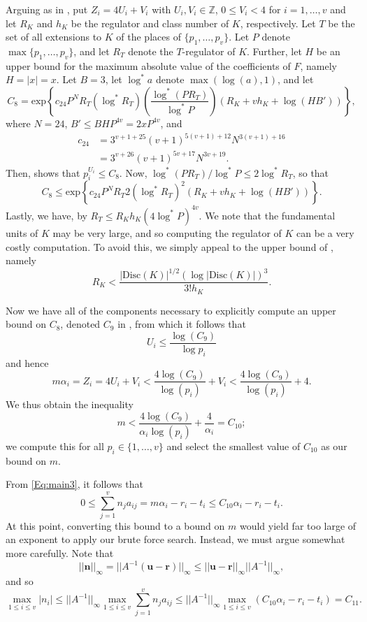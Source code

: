 Arguing as in \cite{BugeaudGyory}, put $Z_i = 4U_i + V_i$ with $U_i, V_i \in \mathbb{Z}$, $0 \leq V_i < 4$ for $i = 1, \dots, v$ and let $R_K$ and $h_K$ be the regulator and class number of $K$, respectively. Let $T$ be the set of all extensions to $K$ of the places of $\{p_1, \dots, p_v\}$. Let $P$ denote $\max\{p_1, \dots, p_v\}$, and let $R_T$ denote the $T$-regulator of $K$. Further, let $H$ be an upper bound for the maximum absolute value of the coefficients of $F$, namely $H = |x| = x$. Let $B = 3$, let $\log^*{a}$ denote $\max(\log(a), 1)$, and let
\[C_8 = \text{exp}\left\{c_{24}P^N R_T (\log^*R_T)\left(\frac{\log^*(PR_T)}{\log^*P}\right)(R_{K} + vh_{K} + \log(HB'))\right\},\]
where $N = 24$, $B' \leq BHP^{4v} = 2xP^{4v}$, and 
\[\begin{array}{cc}
c_{24}  & = 3^{v+1 +25}(v+1)^{5(v+1) +12} N^{3(v+1)+16} \\
	& = 3^{v + 26}(v+1)^{5v+17}N^{3v + 19}.
\end{array}\]
Then, \cite{BugeaudGyory} shows that $p_i^{U_i} \leq C_8$. Now, ${\log^*(PR_T)/\log^*P \leq 2\log^*R_T}$, so that 
\[C_8 \leq \text{exp}\left\{c_{24}P^N R_T 2(\log^*R_T)^2(R_{K} + vh_{K} + \log(HB'))\right\}.\] 
Lastly, we have, by \cite{BugeaudGyory} $R_T \leq R_Kh_K(4\log^*P)^{4v}$. We note that the fundamental units of $K$ may be very large, and so computing the regulator of $K$ can be a very costly computation. To avoid this, we simply appeal to the upper bound of \cite{BugeaudGyory}, namely
\[R_K < \frac{|\text{Disc}(K)|^{1/2}(\log|\text{Disc}(K)|)^{3}}{3!h_K}.\]

Now we have all of the components necessary to explicitly compute an upper bound on $C_8$, denoted $C_9$ in \cite{BugeaudGyory}, from which it follows that
\[U_i \leq \frac{\log(C_9)}{\log{p_i}}\]
and hence
\[m\alpha_i = Z_i = 4U_i + V_i < \frac{4\log(C_9)}{\log(p_i)} + V_i < \frac{4\log(C_9)}{\log(p_i)} + 4.\] 
We thus obtain the inequality  
\[m < \frac{4\log(C_9)}{\alpha_i\log(p_i)} + \frac{4}{\alpha_i} = C_{10};\]
we compute this for all $p_i \in \{1, \dots, v\}$ and select the smallest value of $C_{10}$ as our bound on $m$. 
 
From \eqref{Eq:main3}, it follows that
\[0 \leq \sum_{j=1}^v n_ja_{ij} = m\alpha_i - r_i - t_i \leq C_{10}\alpha_i - r_i - t_i.\]
At this point, converting this bound to a bound on $m$ would yield far too large of an exponent to apply our brute force search. Instead, we must argue somewhat more carefully. 
Note that 
\[||\mathbf{n}||_{\infty} = ||A^{-1}(\mathbf{u} - \mathbf{r})||_{\infty} \leq ||\mathbf{u} - \mathbf{r}||_{\infty}||A^{-1}||_{\infty},\]
and so
\[\max_{1 \leq i \leq v}|n_i| \leq ||A^{-1}||_{\infty}\max_{1 \leq i\leq v}\sum_{j = 1}^v n_j a_{ij}
\leq ||A^{-1}||_{\infty} \max_{1 \leq i\leq v}(C_{10}\alpha_i - r_i - t_i) = C_{11}.\]

